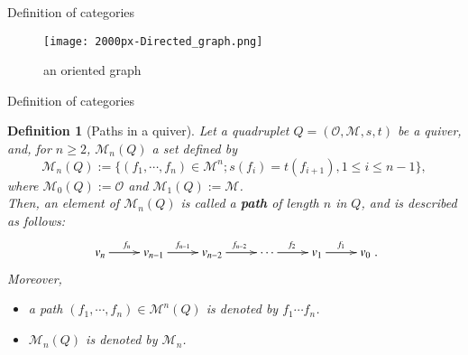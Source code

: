 \documentclass[dvipdfmx,10pt,notheorems]{beamer}
\newtheorem{definition}[theorem]{Definition}
\renewcommand{\#}{^\sharp}
\begin{document}
	\begin{frame}{Definition of categories}
			\begin{figure}
					\texttt{[image: 2000px-Directed\_graph.png]}
					\caption{an oriented graph}
					\label{ImageOfAnOrientedGraph}
			\end{figure}
	\end{frame}
	
		
		
	\begin{frame}{Definition of categories}			
			\begin{definition}[Paths in a quiver]
					Let a quadruplet $Q=(\mathcal{O},\mathcal{M},s,t)$ be a quiver,
					and, for $n\geq 2$, $\mathcal{M}_n(Q)$ a set defined by
							$$
									\mathcal{M}_n(Q):=\{
									(f_1,\cdots,f_n)\in\mathcal{M}^n; s(f_i)=t(f_{i+1}), 1\leq i\leq n-1
									\},
							$$
					where $\mathcal{M}_0(Q):=\mathcal{O}$ and $\mathcal{M}_1(Q):=\mathcal{M}$.\\
					Then, an element of $\mathcal{M}_n(Q)$ is called a {\bf path} of length $n$ in $Q$, and is described as follows:
							\begin{equation*}
									\begin{gathered}
															\xymatrix{
															v_n
															\ar[r]^{f_n}
															&
															v_{n-1}
															\ar[r]^{f_{n-1}}
															&
															v_{n-2}
															\ar[r]^{f_{n-2}}
															&
															\cdots
															\ar[r]^{f_2}
															&
															v_{1}
															\ar[r]^{f_1}
															&
															v_0
															}.
									\end{gathered}
							\end{equation*}
					Moreover,
							\begin{itemize}
									\item a path $(f_1,\cdots,f_n)\in\mathcal{M}^n(Q)$ is denoted by $f_1 \cdots f_n$.
									\item $\mathcal{M}_n(Q)$ is denoted by $\mathcal{M}_n$.	
							\end{itemize}
			\end{definition}
	\end{frame}		
	
	
	
\end{document}
